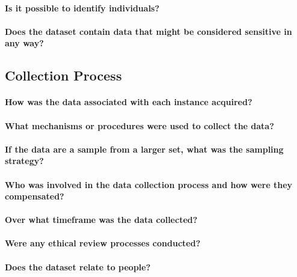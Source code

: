\paragraph{Is it possible to identify individuals?}

\paragraph{Does the dataset contain data that might be considered sensitive in any way?}

\subsection{Collection Process}

\paragraph{How was the data associated with each instance acquired?}

\paragraph{What mechanisms or procedures were used to collect the data?}

\paragraph{If the data are a sample from a larger set, what was the sampling strategy?}

\paragraph{Who was involved in the data collection process and how were they compensated?}

\paragraph{Over what timeframe was the data collected?}

\paragraph{Were any ethical review processes conducted?}

\paragraph{Does the dataset relate to people?}

